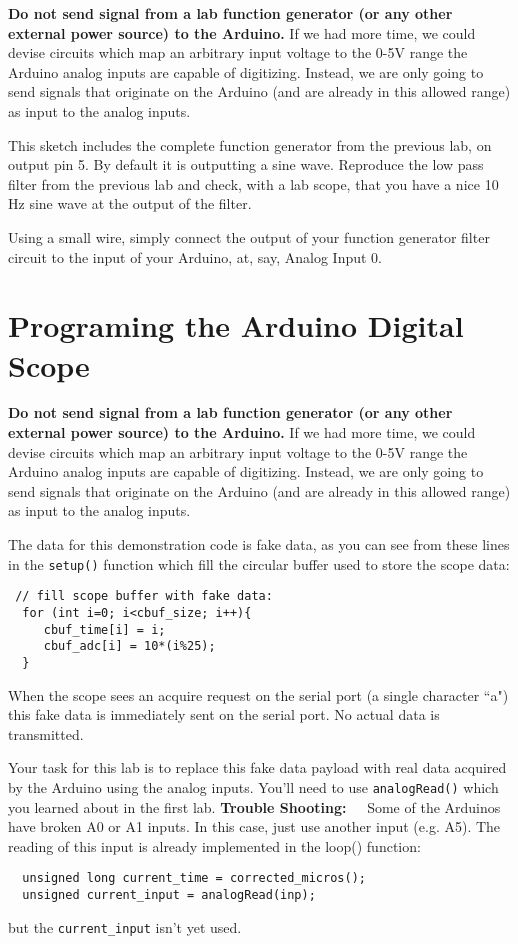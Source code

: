 \documentclass[12pt]{article}
\begin{document}
{\bf Do not send signal from a lab function generator (or any other external power source) to the Arduino.}  If we had more time, we could devise circuits which map an arbitrary input voltage to the 0-5V range the Arduino analog inputs are capable of digitizing.  Instead, we are only going to send signals that originate on the Arduino (and are already in this allowed range) as input to the analog inputs.

This sketch includes the complete function generator from the previous lab, on output pin 5.  By default it is outputting a sine wave.  Reproduce the low pass filter from the previous lab and check, with a lab scope, that you have a nice 10 Hz sine wave at the output of the filter.  

Using a small wire, simply connect the output of your function generator filter circuit to the input of your Arduino, at, say, Analog Input 0.

\section{Programing the Arduino Digital Scope}

\noindent
{\bf Do not send signal from a lab function generator (or any other external power source) to the Arduino.}  If we had more time, we could devise circuits which map an arbitrary input voltage to the 0-5V range the Arduino analog inputs are capable of digitizing.  Instead, we are only going to send signals that originate on the Arduino (and are already in this allowed range) as input to the analog inputs.

The data for this demonstration code is fake data, as you can see from these lines in the {\tt setup()} function which fill the circular buffer used to store the scope data:
\begin{verbatim}
 // fill scope buffer with fake data:
  for (int i=0; i<cbuf_size; i++){
     cbuf_time[i] = i;
     cbuf_adc[i] = 10*(i%25);
  }
\end{verbatim}
When the scope sees an acquire request on the serial port (a single character ``a") this fake data is immediately sent on the serial port.  No actual data is transmitted.

Your task for this lab is to replace this fake data payload with real data acquired by the
Arduino using the analog inputs.  You'll need to use {\tt analogRead()} which you learned about in the first lab.
{\bf Trouble Shooting:~~}  Some of the Arduinos have broken A0 or A1 inputs.  In this case, just
use another input (e.g. A5).  The reading of this input is already implemented in the loop() function:
\begin{verbatim}
  unsigned long current_time = corrected_micros();
  unsigned current_input = analogRead(inp);  
\end{verbatim}
but the {\tt current\_input} isn't yet used.
\end{document}
